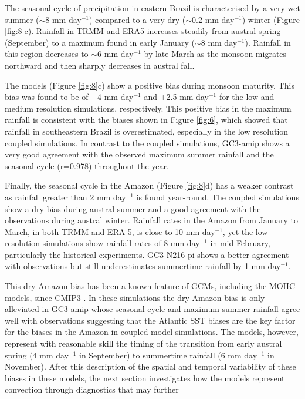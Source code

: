 The seasonal cycle of precipitation in eastern Brazil is characterised by a very wet summer ($\sim$8 mm day$^{-1}$) compared to a very dry ($\sim$0.2 mm day$^{-1}$) winter (Figure \ref{fig:8}c).
Rainfall in TRMM and ERA5 increases steadily from austral spring (September) to a maximum found in early January ($\sim$8 mm day$^{-1}$).
Rainfall in this region decreases to $\sim$6 mm day$^{-1}$ by late March as the monsoon migrates northward and then sharply decreases in austral fall.


The models (Figure \ref{fig:8}c) show a positive bias during monsoon maturity. This bias was found to be of +4 mm day$^{-1}$ and +2.5 mm day$^{-1}$ for the low and medium resolution simulations, respectively.
This positive bias in the maximum rainfall is consistent with the biases shown in Figure \ref{fig:6}, which showed that rainfall in southeastern Brazil is overestimated, especially in the low resolution coupled simulations.   In contrast to the coupled simulations, GC3-amip shows a very good agreement with the observed maximum summer rainfall and the seasonal cycle (r=0.978) throughout the year.

Finally, the seasonal cycle in the Amazon (Figure \ref{fig:8}d) has a weaker contrast as rainfall greater than 2 mm day$^{-1}$ is found year-round. The coupled simulations show a dry bias during austral summer and a good agreement with the observations during austral winter. Rainfall rates in the Amazon from January to March, in both TRMM and ERA-5, is close to 10 mm day$^{-1}$, yet the low resolution simulations show rainfall rates of 8 mm day$^{-1}$ in mid-February, particularly the historical experiments.
GC3 N216-pi shows a better agreement with observations but still underestimates summertime rainfall by 1 mm day$^{-1}$.   

This dry Amazon bias has been a known feature of GCMs, including the MOHC models, since CMIP3 \citep{li2006,yin2013}. In these simulations the dry Amazon bias is only alleviated in GC3-amip whose seasonal cycle and maximum summer rainfall agree well with observations suggesting that the Atlantic SST biases are the key factor for the biases in the Amazon in coupled model simulations.   
The models, however, represent with reasonable skill the timing of the transition from
early austral spring (4 mm day$^{-1}$ in September) to summertime rainfall (6 mm day$^{-1}$ in November).
After this description of the spatial and temporal variability of these biases in these models, the next section investigates how the models represent convection through diagnostics that may further 

